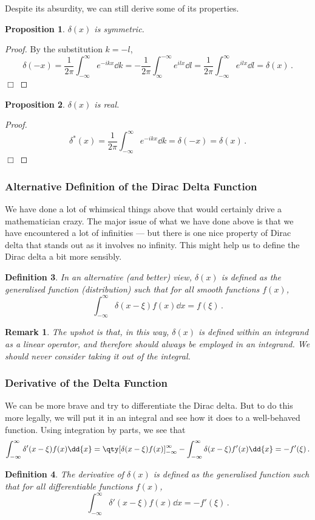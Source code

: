 \documentclass{article}
\theoremstyle{plain}\theoremheaderfont{\normalfont\itshape}\theorembodyfont{\rmfamily}\theoremseparator{.}\newtheorem*{rem}{Remark}\newtheorem*{ex}{Example}\newtheorem*{proof}{Proof}\newtheorem*{altp}{Alternative proof}
\theoremstyle{plain}\theoremheaderfont{\normalfont\bfseries}\theorembodyfont{\rmfamily}\theoremseparator{.}\newtheorem{thm}{Theorem}[section]\newtheorem{lem}[thm]{Lemma}\newtheorem{prop}[thm]{Proposition}\newtheorem*{cor}{Corollary}\newtheorem{defn}[thm]{Definition}\newtheorem{clm}[thm]{Claim}\newtheorem{clminproof}{Claim}
\theoremstyle{break}\theoremheaderfont{\normalfont\itshape}\theorembodyfont{\rmfamily}\theoremseparator{.\medskip}\newtheorem*{proofskip}{Proof}\newtheorem*{exs}{Examples}\newtheorem*{rems}{Remarks}
\theoremstyle{break}\theoremheaderfont{\normalfont\bfseries}\theorembodyfont{\rmfamily}\theoremseparator{.\medskip}\newtheorem{lemskip}[thm]{Lemma}\newtheorem{defnskip}[thm]{Definition}\newtheorem{propskip}[thm]{Proposition}\newtheorem{thmskip}[thm]{Theorem}
\numberwithin{equation}{section}
\newcommand{\qed}{\hfill\ensuremath{\Box}}
\begin{document}
	Despite its absurdity, we can still derive some of its properties.
	\begin{prop}
		\(\delta(x)\) is symmetric.
	\end{prop}
	\begin{proof}
		By the substitution \(k=-l\),
		\[\delta(-x)=\frac{1}{2\pi}\int_{-\infty}^{\infty}e^{-ikx}\dd{k}=-\frac{1}{2\pi}\int_{\infty}^{-\infty}e^{ilx}\dd{l}=\frac{1}{2\pi}\int_{-\infty}^{\infty}e^{ilx}\dd{l}=\delta(x)\,.\]\qed
	\end{proof}
	\begin{prop}
		\(\delta(x)\) is real.
	\end{prop}
	\begin{proof}
		\[\delta^*(x)=\frac{1}{2\pi}\int_{-\infty}^{\infty}e^{-ikx}\dd{k}=\delta(-x)=\delta(x)\,.\]\qed
	\end{proof}

	\subsubsection{Alternative Definition of the Dirac Delta Function}
	We have done a lot of whimsical things above that would certainly drive a mathematician crazy. The major issue of what we have done above is that we have encountered a lot of infinities --- but there is one nice property of Dirac delta that stands out as it involves no infinity. This might help us to define the Dirac delta a bit more sensibly.
	\begin{defn}
		In an alternative (and better) view, \(\delta(x)\) is defined as the \textit{generalised function} (\textit{distribution}) such that for all smooth functions \(f(x)\),
		\[\int_{-\infty}^{\infty}\delta(x-\xi)f(x)\dd{x}=f(\xi)\,.\]
	\end{defn}
	\begin{rem}
		The upshot is that, in this way, \(\delta(x)\) is defined within an integrand as a linear operator, and therefore should always be employed in an integrand. We should never consider taking it out of the integral.
	\end{rem}

	\subsubsection{Derivative of the Delta Function}
	We can be more brave and try to differentiate the Dirac delta. But to do this more legally, we will put it in an integral and see how it does to a well-behaved function. Using integration by parts, we see that
	\[\int_{-\infty}^{\infty}\delta'(x-\xi)f(x)\dd{x}=\qty[\delta(x-\xi)f(x)]^{\infty}_{-\infty}-\int_{-\infty}^{\infty}\delta(x-\xi)f'(x)\dd{x}=-f'(\xi)\,.\]
	\begin{defn}
		The derivative of \(\delta(x)\) is defined as the generalised function such that for all differentiable functions \(f(x)\),
		\[\int_{-\infty}^{\infty}\delta'(x-\xi)f(x)\dd{x}=-f'(\xi)\,.\]
	\end{defn}
	
\end{document}
